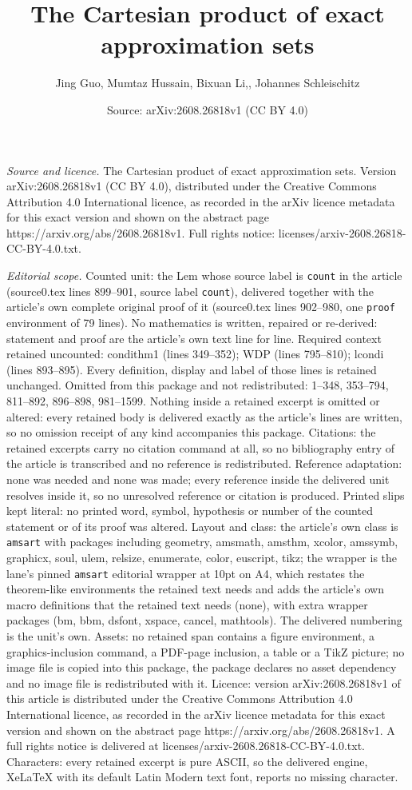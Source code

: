 \documentclass[10pt,a4paper]{amsart}
\title[The Cartesian product of exact approximation sets]{The Cartesian product of exact approximation sets}
\author{Jing Guo, Mumtaz Hussain, Bixuan Li,, Johannes Schleischitz}
\date{Source: arXiv:2608.26818v1 (CC BY 4.0)}
\begin{document}
\maketitle

\noindent\emph{Source and licence.} The Cartesian product of exact approximation sets. Version arXiv:2608.26818v1 (CC BY 4.0), distributed under the Creative Commons Attribution 4.0 International licence, as recorded in the arXiv licence metadata for this exact version and shown on the abstract page https://arxiv.org/abs/2608.26818v1. Full rights notice: licenses/arxiv-2608.26818-CC-BY-4.0.txt.\par\smallskip

\noindent\textit{Editorial scope.} Counted unit: the Lem whose source label is \texttt{count} in the article (source0.tex lines 899--901, source label \texttt{count}), delivered together with the article's own complete original proof of it (source0.tex lines 902--980, one \texttt{proof} environment of 79 lines). No mathematics is written, repaired or re-derived: statement and proof are the article's own text line for line. Required context retained uncounted: condithm1 (lines 349--352); WDP (lines 795--810); lcondi (lines 893--895). Every definition, display and label of those lines is retained unchanged. Omitted from this package and not redistributed: 1--348, 353--794, 811--892, 896--898, 981--1599. Nothing inside a retained excerpt is omitted or altered: every retained body is delivered exactly as the article's lines are written, so no omission receipt of any kind accompanies this package. Citations: the retained excerpts carry no citation command at all, so no bibliography entry of the article is transcribed and no reference is redistributed. Reference adaptation: none was needed and none was made; every reference inside the delivered unit resolves inside it, so no unresolved reference or citation is produced. Printed slips kept literal: no printed word, symbol, hypothesis or number of the counted statement or of its proof was altered. Layout and class: the article's own class is \texttt{amsart} with packages including geometry, amsmath, amsthm, xcolor, amssymb, graphicx, soul, ulem, relsize, enumerate, color, euscript, tikz; the wrapper is the lane's pinned \texttt{amsart} editorial wrapper at 10pt on A4, which restates the theorem-like environments the retained text needs and adds the article's own macro definitions that the retained text needs (none), with extra wrapper packages (bm, bbm, dsfont, xspace, cancel, mathtools). The delivered numbering is the unit's own. Assets: no retained span contains a figure environment, a graphics-inclusion command, a PDF-page inclusion, a table or a TikZ picture; no image file is copied into this package, the package declares no asset dependency and no image file is redistributed with it. Licence: version arXiv:2608.26818v1 of this article is distributed under the Creative Commons Attribution 4.0 International licence, as recorded in the arXiv licence metadata for this exact version and shown on the abstract page https://arxiv.org/abs/2608.26818v1. A full rights notice is delivered at licenses/arxiv-2608.26818-CC-BY-4.0.txt. Characters: every retained excerpt is pure ASCII, so the delivered engine, XeLaTeX with its default Latin Modern text font, reports no missing character.
\end{document}
